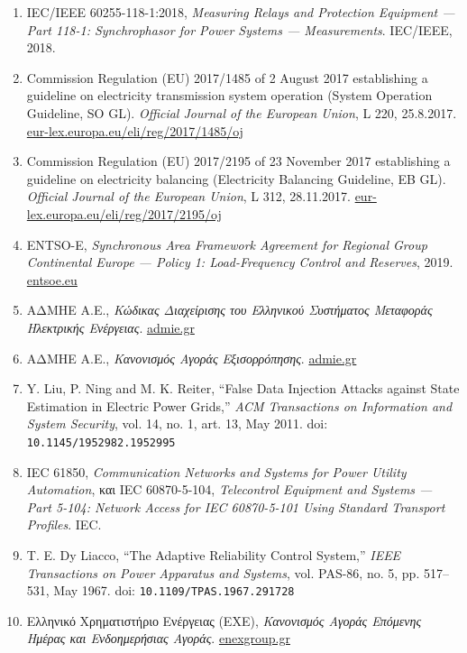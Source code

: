 \begin{enumerate}
\item IEC/IEEE 60255-118-1:2018, \textit{Measuring Relays and Protection Equipment --- Part 118-1:
      Synchrophasor for Power Systems --- Measurements}. IEC/IEEE, 2018.

\item Commission Regulation (EU) 2017/1485 of 2 August 2017 establishing a guideline on electricity
      transmission system operation (System Operation Guideline, SO GL). \textit{Official Journal
      of the European Union}, L 220, 25.8.2017.
      \href{https://eur-lex.europa.eu/eli/reg/2017/1485/oj}{eur-lex.europa.eu/eli/reg/2017/1485/oj}

\item Commission Regulation (EU) 2017/2195 of 23 November 2017 establishing a guideline on
      electricity balancing (Electricity Balancing Guideline, EB GL). \textit{Official Journal of
      the European Union}, L 312, 28.11.2017.
      \href{https://eur-lex.europa.eu/eli/reg/2017/2195/oj}{eur-lex.europa.eu/eli/reg/2017/2195/oj}

\item ENTSO-E, \textit{Synchronous Area Framework Agreement for Regional Group Continental Europe
      --- Policy 1: Load-Frequency Control and Reserves}, 2019.
      \href{https://www.entsoe.eu/}{entsoe.eu}

\item ΑΔΜΗΕ Α.Ε., \textit{Κώδικας Διαχείρισης του Ελληνικού Συστήματος Μεταφοράς Ηλεκτρικής
      Ενέργειας}. \href{https://www.admie.gr/}{admie.gr}

\item ΑΔΜΗΕ Α.Ε., \textit{Κανονισμός Αγοράς Εξισορρόπησης}. \href{https://www.admie.gr/}{admie.gr}

\item Y. Liu, P. Ning and M. K. Reiter, ``False Data Injection Attacks against State Estimation in
      Electric Power Grids,'' \textit{ACM Transactions on Information and System Security},
      vol. 14, no. 1, art. 13, May 2011.
      doi: \texttt{10.1145/1952982.1952995}

\item IEC 61850, \textit{Communication Networks and Systems for Power Utility Automation}, και
      IEC 60870-5-104, \textit{Telecontrol Equipment and Systems --- Part 5-104: Network Access for
      IEC 60870-5-101 Using Standard Transport Profiles}. IEC.

\item T. E. Dy Liacco, ``The Adaptive Reliability Control System,'' \textit{IEEE Transactions on
      Power Apparatus and Systems}, vol. PAS-86, no. 5, pp. 517--531, May 1967.
      doi: \texttt{10.1109/TPAS.1967.291728}

\item Ελληνικό Χρηματιστήριο Ενέργειας (ΕΧΕ), \textit{Κανονισμός Αγοράς Επόμενης Ημέρας και
      Ενδοημερήσιας Αγοράς}. \href{https://www.enexgroup.gr/}{enexgroup.gr}

\end{enumerate}
